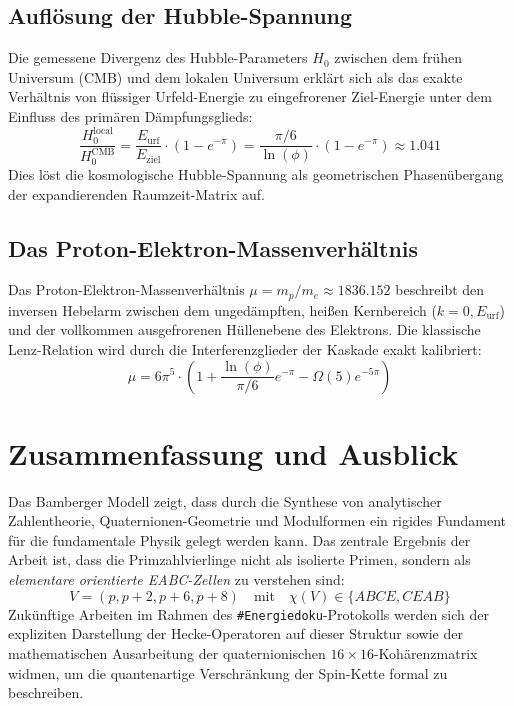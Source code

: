\documentclass[11pt,a4paper]{article}
\theoremstyle{plain}
\theoremstyle{definition}
\numberwithin{equation}{section}
\begin{document}
\subsection{Auflösung der Hubble-Spannung}
Die gemessene Divergenz des Hubble-Parameters $H_0$ zwischen dem frühen Universum (CMB) und dem lokalen Universum erklärt sich als das exakte Verhältnis von flüssiger Urfeld-Energie zu eingefrorener Ziel-Energie unter dem Einfluss des primären Dämpfungsglieds:
\begin{equation}
\frac{H_{0}^{\text{local}}}{H_{0}^{\text{CMB}}} = \frac{E_{\text{urf}}}{E_{\text{ziel}}} \cdot (1 - e^{-\pi}) = \frac{\pi/6}{\ln(\phi)} \cdot (1 - e^{-\pi}) \approx 1.041
\end{equation}
Dies löst die kosmologische Hubble-Spannung als geometrischen Phasenübergang der expandierenden Raumzeit-Matrix auf.

\subsection{Das Proton-Elektron-Massenverhältnis}
Das Proton-Elektron-Massenverhältnis $\mu = m_p/m_e \approx 1836.152$ beschreibt den inversen Hebelarm zwischen dem ungedämpften, heißen Kernbereich ($k=0, E_{\text{urf}}$) und der vollkommen ausgefrorenen Hüllenebene des Elektrons. Die klassische Lenz-Relation wird durch die Interferenzglieder der Kaskade exakt kalibriert:
\begin{equation}
\mu = 6\pi^5 \cdot \left( 1 + \frac{\ln(\phi)}{\pi/6}e^{-\pi} - \Omega(5)e^{-5\pi} \right)
\end{equation}

\section{Zusammenfassung und Ausblick}
Das Bamberger Modell zeigt, dass durch die Synthese von analytischer Zahlentheorie, Quaternionen-Geometrie und Modulformen ein rigides Fundament für die fundamentale Physik gelegt werden kann. Das zentrale Ergebnis der Arbeit ist, dass die Primzahlvierlinge nicht als isolierte Primen, sondern als \emph{elementare orientierte EABC-Zellen} zu verstehen sind:
\begin{equation}
V = (p, p+2, p+6, p+8) \quad \text{mit} \quad \chi(V) \in \{ABCE, CEAB\}
\end{equation}
Zukünftige Arbeiten im Rahmen des \texttt{\#Energiedoku}-Protokolls werden sich der expliziten Darstellung der Hecke-Operatoren auf dieser Struktur sowie der mathematischen Ausarbeitung der quaternionischen $16 \times 16$-Kohärenzmatrix widmen, um die quantenartige Verschränkung der Spin-Kette formal zu beschreiben.
\end{document}
